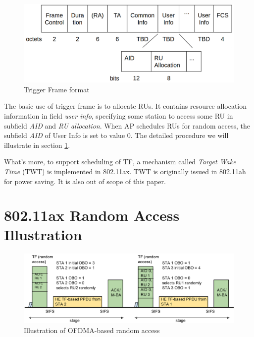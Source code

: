 \begin{figure}[!ht]
\centering
\includegraphics[scale=0.3]{./figure/chp2/fig_tf_format.png}
\caption{Trigger Frame format}
\label{fig_TF_format}
\end{figure}

The basic use of trigger frame is to allocate RUs. It contains resource allocation information in field \textit{user info}, specifying some station to access some RU in subfield \textit{AID} and \textit{RU allocation}.  
When AP schedules RUs for random access, the subfield \textit{AID} of User Info is set to value 0. The detailed procedure we will illustrate in section \ref{sec_RA_illu}. 

What's more, to support scheduling of TF, a mechanism called \textit{Target Wake Time} (TWT) is implemented in 802.11ax. TWT is originally issued in 802.11ah for power saving\cite{khorov2015survey}. It is also out of scope of this paper.



\section{802.11ax Random Access Illustration}		\label{sec_RA_illu}
\begin{figure}[!t]
\centering
\includegraphics[scale=0.35]{./figure/chp2/RA_illu.png}
\caption{Illustration of OFDMA-based random access}
\label{fig_ra_illu}
\end{figure}

